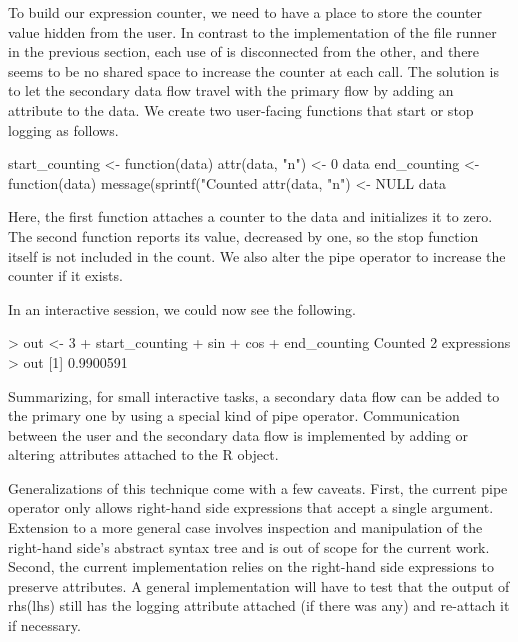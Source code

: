 To build our expression counter, we need to have a place to store the counter
value hidden from the user. In contrast to the implementation of the file
runner in the previous section, each use of  is disconnected from
the other, and there seems to be no shared space to increase the counter at
each call. The solution is to let the secondary data flow travel with the
primary flow by adding an attribute to the data. We create two user-facing
functions that start or stop logging as follows.
\begin{example}
  start_counting <- function(data){
    attr(data, "n") <- 0
    data
  }
  end_counting <- function(data){
    message(sprintf("Counted %
    attr(data, "n") <- NULL
    data
  }
\end{example}
Here, the first function attaches a counter to the data and initializes it to
zero. The second function reports its value, decreased by one, so the stop
function itself is not included in the count.  We also alter the pipe operator
to increase the counter if it exists.
In an interactive session, we could now see the following.
\begin{example}
  > out <- 3 %
  +  start_counting %
  +    sin %
  +    cos %
  +  end_counting
  Counted 2 expressions
  > out
  [1] 0.9900591
\end{example}

Summarizing, for small interactive tasks, a secondary data flow can be added to
the primary one by using a special kind of pipe operator. Communication between
the user and the secondary data flow is implemented by adding or altering
attributes attached to the R object.

Generalizations of this technique come with a few caveats. First, the current
pipe operator only allows right-hand side expressions that accept a single
argument. Extension to a more general case involves inspection and manipulation
of the right-hand side's abstract syntax tree and is out of scope for the
current work. Second, the current implementation relies on the right-hand side
expressions to preserve attributes. A general implementation will have to test
that the output of rhs(lhs) still has the logging attribute attached (if there
was any) and re-attach it if necessary.

